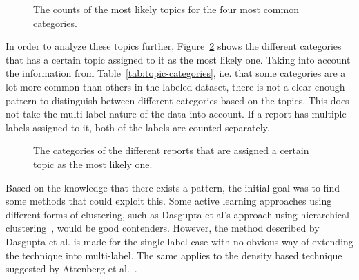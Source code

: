 \begin{figure}[h!]
    \centering
    \quad
    \caption{The counts of the most likely topics for the four most common categories.}
    \label{fig:category-label-distribution}
\end{figure}

In order to analyze these topics further, Figure~\ref{fig:topic-category-distribution} shows the different categories that has a certain topic assigned to it as the most likely one.
Taking into account the information from Table~\ref{tab:topic-categories}, i.e. that some categories are a lot more common than others in the labeled dataset, there is not a clear enough pattern to distinguish between different categories based on the topics.
This does not take the multi-label nature of the data into account.
If a report has multiple labels assigned to it, both of the labels are counted separately.

\begin{figure}[h!]
    \centering
    \quad
    \caption{The categories of the different reports that are assigned a certain topic as the most likely one.}
    \label{fig:topic-category-distribution}
\end{figure}

Based on the knowledge that there exists a pattern, the initial goal was to find some methods that could exploit this.
Some active learning approaches using different forms of clustering, such as Dasgupta et al\@'s approach using hierarchical clustering~\cite{dasgupta2008hierarchical}, would be good contenders.
However, the method described by Dasgupta et al\@. is made for the single-label case with no obvious way of extending the technique into multi-label.
The same applies to the density based technique suggested by Attenberg et al\@.~\cite{attenberg2013class}.

